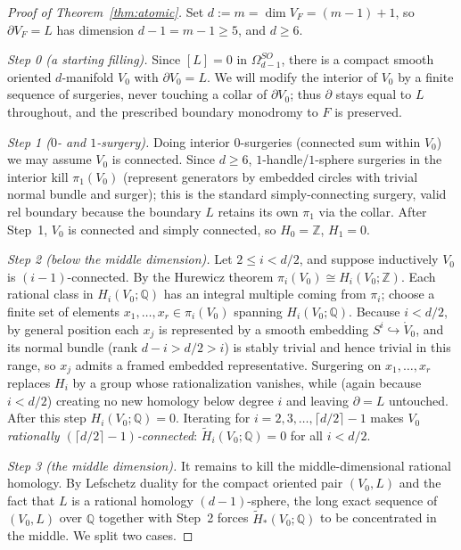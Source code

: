 \documentclass[12pt]{article}
\theoremstyle{definition}
\begin{document}
\begin{proof}[Proof of Theorem~\ref{thm:atomic}]
Set $d:=m=\dim V_F=(m-1)+1$, so $\partial V_F=L$ has dimension $d-1=m-1\ge5$,
and $d\ge 6$.

\smallskip
\emph{Step 0 (a starting filling).} Since $[L]=0$ in $\Omega^{SO}_{d-1}$, there
is a compact smooth oriented $d$-manifold $V_0$ with $\partial V_0=L$. We will
modify the interior of $V_0$ by a finite sequence of surgeries, never touching a
collar of $\partial V_0$; thus $\partial$ stays equal to $L$ throughout, and the
prescribed boundary monodromy to $F$ is preserved.

\smallskip
\emph{Step 1 ($0$- and $1$-surgery).} Doing interior $0$-surgeries
(connected sum within $V_0$) we may assume $V_0$ is connected. Since $d\ge6$,
$1$-handle/$1$-sphere surgeries in the interior kill $\pi_1(V_0)$ (represent
generators by embedded circles with trivial normal bundle and surger); this is
the standard simply-connecting surgery, valid rel boundary because the boundary
$L$ retains its own $\pi_1$ via the collar. After Step~1, $V_0$ is connected and
simply connected, so $H_0=\mathbb{Z}$, $H_1=0$.

\smallskip
\emph{Step 2 (below the middle dimension).} Let $2\le i<d/2$, and suppose
inductively $V_0$ is $(i-1)$-connected. By the Hurewicz theorem
$\pi_i(V_0)\cong H_i(V_0;\mathbb{Z})$. Each rational class in
$H_i(V_0;\mathbb{Q})$ has an integral multiple coming from $\pi_i$; choose a
finite set of elements $x_1,\dots,x_r\in\pi_i(V_0)$ spanning
$H_i(V_0;\mathbb{Q})$. Because $i<d/2$, by general position each $x_j$ is
represented by a smooth embedding $S^i\hookrightarrow\mathring V_0$, and its
normal bundle (rank $d-i>d/2>i$) is stably trivial and hence trivial in this
range, so $x_j$ admits a framed embedded representative. Surgering on
$x_1,\dots,x_r$ replaces $H_i$ by a group whose rationalization vanishes, while
(again because $i<d/2$) creating no new homology below degree $i$ and leaving
$\partial=L$ untouched. After this step $H_i(V_0;\mathbb{Q})=0$. Iterating for
$i=2,3,\dots,\lceil d/2\rceil-1$ makes $V_0$ \emph{rationally
$(\lceil d/2\rceil-1)$-connected}: $\widetilde H_i(V_0;\mathbb{Q})=0$ for all
$i<d/2$.

\smallskip
\emph{Step 3 (the middle dimension).} It remains to kill the middle-dimensional
rational homology. By Lefschetz duality for the compact oriented pair
$(V_0,L)$ and the fact that $L$ is a rational homology $(d-1)$-sphere, the long
exact sequence of $(V_0,L)$ over $\mathbb{Q}$ together with Step~2 forces
$\widetilde H_*(V_0;\mathbb{Q})$ to be concentrated in the middle. We split two
cases.


\end{proof}
\end{document}
